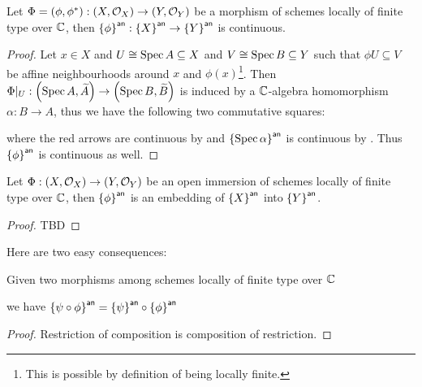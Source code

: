 \begin{lemma}
  Let $\Phi = (\phi, \phi^{*}) : \left(X, \mathcal{O}_{X}\right) \to \left(Y, \mathcal{O}_{Y}\right)$ be a morphism of schemes locally of finite type over $\mathbb{C}$, then ${\left\{{\phi}\right\}}^{\mathsf{an}} : {\left\{{X}\right\}}^{\mathsf{an}} \to {\left\{{Y}\right\}}^{\mathsf{an}}$ is continuous.
\end{lemma}
\begin{proof}
  Let $x \in X$ and $U \cong \operatorname{Spec} A \subseteq X$ and $V \cong \operatorname{Spec} B \subseteq Y$ such that $\phi U \subseteq V$ be affine neighbourhoods around $x$ and $\phi(x)$\footnote{This is possible by definition of being locally finite.}. Then $\Phi|_{U} : \left(\operatorname*{Spec}{A}, \widetilde{A}\right) \to \left(\operatorname*{Spec}{B}, \widetilde{B}\right)$ is induced by a $\mathbb{C}$-algebra homomorphism $\alpha: B \to A$, thus we have the following two commutative squares:
  \begin{center}
  \end{center}
  where the red arrows are continuous by  and ${\left\{{\operatorname{Spec}\alpha}\right\}}^{\mathsf{an}}$ is continuous by . Thus ${\left\{{\phi}\right\}}^{\mathsf{an}}$ is continuous as well.
\end{proof}

\begin{corollary}
  Let $\Phi : \left(X, \mathcal{O}_{X}\right) \to \left(Y, \mathcal{O}_{Y}\right)$ be an open immersion of schemes locally of finite type over $\mathbb{C}$, then ${\left\{{\phi}\right\}}^{\mathsf{an}}$ is an embedding of ${\left\{{X}\right\}}^{\mathsf{an}}$ into ${\left\{{Y}\right\}}^{\mathsf{an}}$.
\end{corollary}
\begin{proof}
  TBD
\end{proof}

Here are two easy consequences:
\begin{corollary}
  Given two morphisms among schemes locally of finite type over $\mathbb{C}$
  \begin{center}
  \end{center}
  we have ${\left\{{\psi\circ\phi}\right\}}^{\mathsf{an}} = {\left\{{\psi}\right\}}^{\mathsf{an}} \circ {\left\{{\phi}\right\}}^{\mathsf{an}}$
\end{corollary}
\begin{proof}
 Restriction of composition is composition of restriction.
\end{proof}


